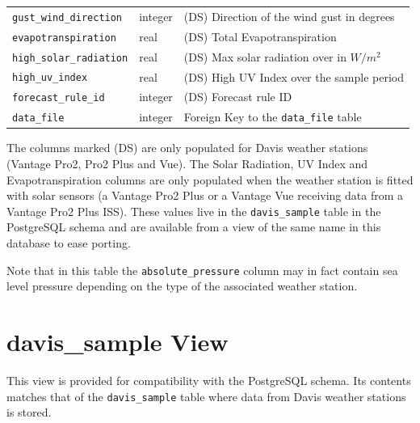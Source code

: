 \documentclass[a4paper,10pt]{book}
\begin{document}
\begin{tabular}{p{4.7cm} p{1.5cm} l}
\verb|gust_wind_direction| & integer & (DS) Direction of the wind gust in degrees\\
\verb|evapotranspiration| & real & (DS) Total Evapotranspiration\\
\verb|high_solar_radiation| & real & (DS) Max solar radiation over in $W/m^2$\\
\verb|high_uv_index| & real & (DS) High UV Index over the sample period\\
\verb|forecast_rule_id| & integer & (DS) Forecast rule ID\\
\verb|data_file| & integer & Foreign Key to the \verb|data_file| table\\
\hline
\end{tabular}

The columns marked (DS) are only populated for Davis weather stations (Vantage Pro2, Pro2 Plus and Vue). The Solar Radiation, UV Index and Evapotranspiration columns are only populated when the weather station is fitted with solar sensors (a Vantage Pro2 Plus or a Vantage Vue receiving data from a Vantage Pro2 Plus ISS). These values live in the \verb|davis_sample| table in the PostgreSQL schema and are available from a view of the same name in this database to ease porting.

Note that in this table the \verb|absolute_pressure| column may in fact contain sea level pressure depending on the type of the associated weather station.

\section{davis\_sample View}
This view is provided for compatibility with the PostgreSQL schema. Its contents matches that of the \verb|davis_sample| table where data from Davis weather stations is stored.
\end{document}

